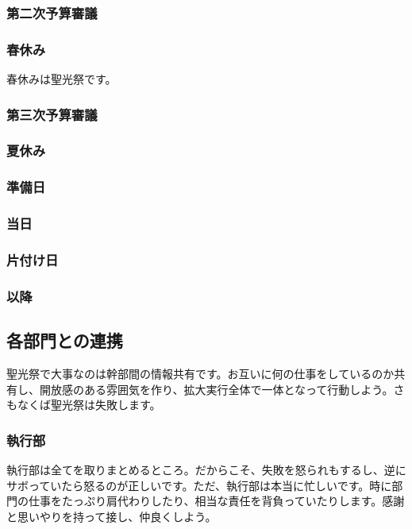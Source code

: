\documentclass[dvipdfmx,jb5]{jarticle}
\begin{document}
\subsubsection{第二次予算審議}

\subsubsection{春休み}
春休みは聖光祭です。

\subsubsection{第三次予算審議}

\subsubsection{夏休み}

\subsubsection{準備日}

\subsubsection{当日}

\subsubsection{片付け日}

\subsubsection{以降}

\subsection{各部門との連携}
聖光祭で大事なのは幹部間の情報共有です。お互いに何の仕事をしているのか共有し、開放感のある雰囲気を作り、拡大実行全体で一体となって行動しよう。さもなくば聖光祭は失敗します。

\subsubsection{執行部}
執行部は全てを取りまとめるところ。だからこそ、失敗を怒られもするし、逆にサボっていたら怒るのが正しいです。ただ、執行部は本当に忙しいです。時に部門の仕事をたっぷり肩代わりしたり、相当な責任を背負っていたりします。感謝と思いやりを持って接し、仲良くしよう。
\end{document}
